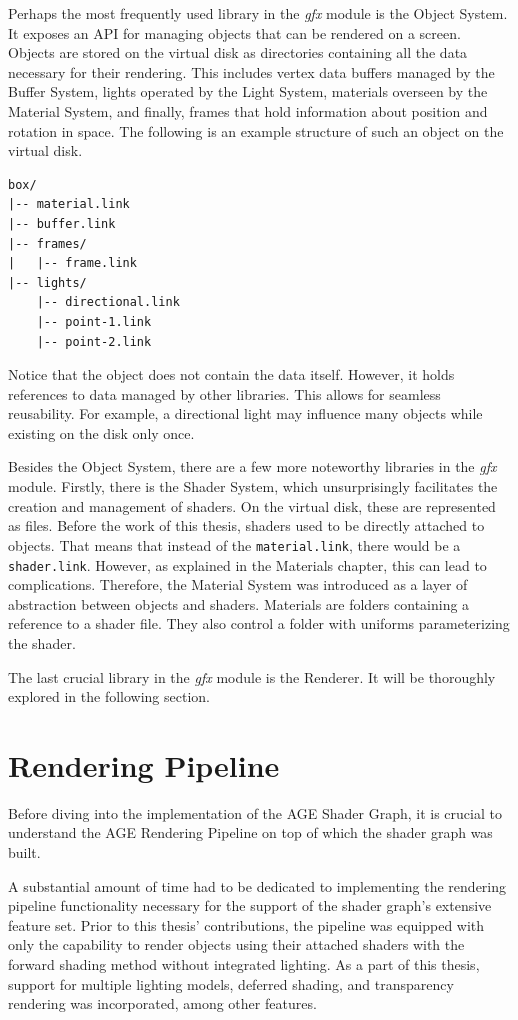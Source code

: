 \documentclass[
  digital,     %
  oneside,     %
  nosansbold,  %
  nocolorbold, %
  lof,         %
  lot,         %
]{fithesis4}
\begin{document}
Perhaps the most frequently used library in the \textit{gfx} module is the Object System.
It exposes an API for managing objects that can be rendered on a screen.
Objects are stored on the virtual disk as directories containing all the data
necessary for their rendering. This includes vertex data buffers managed by the Buffer System,
lights operated by the Light System, materials overseen by the Material System, and finally, frames that
hold information about position and rotation in space.
The following is an example structure of such an object on the virtual disk.


\begin{verbatim}
box/
|-- material.link
|-- buffer.link
|-- frames/
|   |-- frame.link
|-- lights/
    |-- directional.link
    |-- point-1.link
    |-- point-2.link
\end{verbatim}


Notice that the object does not contain the data itself. However, it holds references to data managed by other
libraries. This allows for seamless reusability. For example, a directional light may influence many objects
while existing on the disk only once.

Besides the Object System, there are a few more noteworthy libraries in the \textit{gfx} module.
Firstly, there is the Shader System, which unsurprisingly facilitates the creation and management
of shaders. On the virtual disk, these are represented as files.
Before the work of this thesis, shaders used to be directly attached to objects.
That means that instead of the \verb|material.link|, there would be a \verb|shader.link|.
However, as explained in the Materials chapter, this can lead to complications. Therefore,
the Material System was introduced as a layer of abstraction between objects and shaders.
Materials are folders containing a reference to a shader file. They also control a folder with uniforms
parameterizing the shader.

The last crucial library in the \textit{gfx} module is the Renderer. It will be thoroughly explored
in the following section.

\section{Rendering Pipeline}
Before diving into the implementation of the AGE Shader Graph, it is crucial to understand
the AGE Rendering Pipeline on top of which the shader graph was built.

A substantial amount of time had to be dedicated to implementing the rendering pipeline functionality
necessary for the support of the shader graph's extensive feature set.
Prior to this thesis' contributions,
the pipeline was equipped with only the capability to render objects using their attached shaders
with the forward shading method without integrated lighting. As a part of this thesis, support for multiple lighting models,
deferred shading, and transparency rendering was incorporated, among other features.
\end{document}
